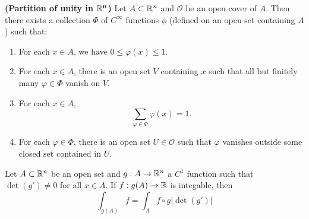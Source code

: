 
\begin{theorem}\textbf{(Partition of unity in $\mathbf{\mathbb{R}^n}$)\label{thm:partition of unity}}
\cite{Spivak1965} Let $A\subset \mathbb{R}^n$ and $\mathscr O$ be an open cover of $A$. Then there exists a collection $\Phi$ of $C^{\infty}$ functions $\phi$ (defined on an open set containing $A$) such that: 
\begin{enumerate}
    \item For each $x\in A$, we have $0\leq\varphi(x)\leq1$.

    \item For each $x\in A$, there is an open set $V$ containing $x$
    such that all but finitely many $\varphi\in\Phi$ vanish on $V$.

    \item For each $x\in A$,
    \[
    \sum_{\varphi\in\Phi}\varphi(x)=1.
    \]

    \item For each $\varphi\in\Phi$, there is an open set
    $U\in\mathscr O$ such that $\varphi$ vanishes outside some
    closed set contained in $U$.
\end{enumerate}
\end{theorem}

\begin{theorem}\cite{Spivak1965}
    \label{thm:change_of_variable}
Let $A\subset \mathbb{R}^n$ be an open set and $g:A\to \mathbb{R}^n$ a $C^1$ function such that $\det (g')\neq 0$ for all $x\in A$. If $f:g(A)\to \mathbb{R}$ is integable, then $$\int_{g(A)} f=\int_A f\circ g |\det(g')| $$   
\end{theorem}



